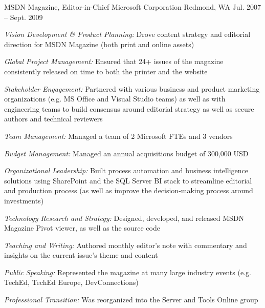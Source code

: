 \begin{cventries}
\cventry
{MSDN Magazine, Editor-in-Chief}
{Microsoft Corporation}
{Redmond, WA}
{Jul. 2007 – Sept. 2009}
{ %
\begin{cvitems}
\item {\emph{Vision Development \& Product Planning:} Drove content strategy and editorial direction for MSDN Magazine (both print and online assets) }
\item {\emph{Global Project Management:} Ensured that 24+ issues of the magazine consistently released on time to both the printer and the website }
\item {\emph{Stakeholder Engagement:} Partnered with various business and product marketing organizations (e.g. MS Office and Visual Studio teams) as well as with engineering teams to build consensus around editorial strategy as well as secure authors and technical reviewers }
\item {\emph{Team Management:} Managed a team of 2 Microsoft FTEs and 3 vendors }
\item {\emph{Budget Management:} Managed an annual acquisitions budget of 300,000 USD }
\item {\emph{Organizational Leadership:} Built process automation and business intelligence solutions using SharePoint and the SQL Server BI stack to streamline editorial and production process (as well as improve the decision-making process around investments) }
\item {\emph{Technology Research and Strategy:} Designed, developed, and released MSDN Magazine Pivot viewer, as well as the source code }
\item {\emph{Teaching and Writing:} Authored monthly editor’s note with commentary and insights on the current issue’s theme and content }
\item {\emph{Public Speaking:} Represented the magazine at many large industry events (e.g. TechEd, TechEd Europe, DevConnections) }
\item {\emph{Professional Transition:} Was reorganized into the Server and Tools Online group }
\end{cvitems}
}



\end{cventries}
